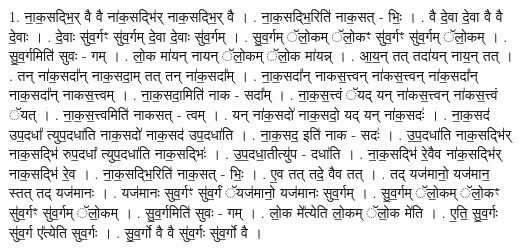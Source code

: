 \documentclass[17pt]{extarticle}
\begin{document}
1. ना॒क॒सद्भि॒र् वै वै ना॑क॒सद्भि॑र् नाक॒सद्भि॒र् वै । . ना॒क॒सद्भि॒रिति॑ नाक॒सत् - भिः॒ । . वै दे॒वा दे॒वा वै वै दे॒वाः । . दे॒वाः सु॑व॒र्गꣳ सु॑व॒र्गम् दे॒वा दे॒वाः सु॑व॒र्गम् । . सु॒व॒र्गम् ॅलो॒कम् ॅलो॒कꣳ सु॑व॒र्गꣳ सु॑व॒र्गम् ॅलो॒कम् । . सु॒व॒र्गमिति॑ सुवः - गम् । . लो॒क मा॑यन् नायन् ॅलो॒कम् ॅलो॒क मा॑यन्न् । . आ॒य॒न् तत् तदा॑यन् नाय॒न् तत् । . तन् ना॑क॒सदा᳚न् नाक॒सदा॒म् तत् तन् ना॑क॒सदा᳚म् । . ना॒क॒सदा᳚न् नाकस॒त्त्वन् ना॑कस॒त्त्वन् ना॑क॒सदा᳚न् नाक॒सदा᳚न् नाकस॒त्त्वम् । . ना॒क॒सदा॒मिति॑ नाक - सदा᳚म् । . ना॒क॒स॒त्त्वं ॅयद् यन् ना॑कस॒त्त्वन् ना॑कस॒त्त्वं ॅयत् । . ना॒क॒स॒त्त्वमिति॑ नाकसत् - त्वम् । . यन् ना॑क॒सदो॑ नाक॒सदो॒ यद् यन् ना॑क॒सदः॑ । . ना॒क॒सद॑ उप॒दधा᳚ त्युप॒दधा॑ति नाक॒सदो॑ नाक॒सद॑ उप॒दधा॑ति । . ना॒क॒सद॒ इति॑ नाक - सदः॑ । . उ॒प॒दधा॑ति नाक॒सद्भि॑र् नाक॒सद्भि॑ रुप॒दधा᳚ त्युप॒दधा॑ति नाक॒सद्भिः॑ । . उ॒प॒दधा॒तीत्यु॑प - दधा॑ति । . ना॒क॒सद्भि॑ रे॒वैव ना॑क॒सद्भि॑र् नाक॒सद्भि॑ रे॒व । . ना॒क॒सद्भि॒रिति॑ नाक॒सत् - भिः॒ । . ए॒व तत् तदे॒ वैव तत् । . तद् यज॑मानो॒ यज॑मान॒ स्तत् तद् यज॑मानः । . यज॑मानः सुव॒र्गꣳ सु॑व॒र्गं ॅयज॑मानो॒ यज॑मानः सुव॒र्गम् । . सु॒व॒र्गम् ॅलो॒कम् ॅलो॒कꣳ सु॑व॒र्गꣳ सु॑व॒र्गम् ॅलो॒कम् । . सु॒व॒र्गमिति॑ सुवः - गम् । . लो॒क मे᳚त्येति लो॒कम् ॅलो॒क मे॑ति । . ए॒ति॒ सु॒व॒र्गः सु॑व॒र्ग ए᳚त्येति सुव॒र्गः । . सु॒व॒र्गो वै वै सु॑व॒र्गः सु॑व॒र्गो वै । \newline
\end{document}

